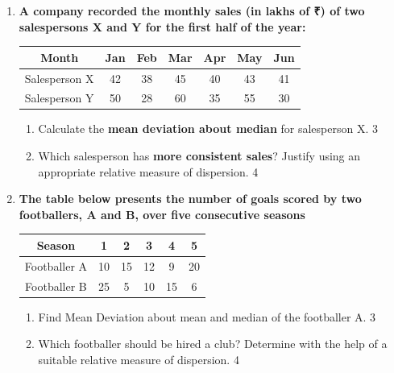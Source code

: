 \documentclass[a4paper,oneside]{book}
\begin{document}
\begin{enumerate}
  
  \begin{enumerate}
    \item
	How is the Range defined? \hfill 1
    \item
	Can the standard deviation exceed the variance? Prove. \hfill 2
    \item  
	Find the standard deviation of the above data and compare the cities. \hfill 3
    \item
	Examine the efficacy the standard deviation in light of the given context. \\ Is a better measure availabe? Analyze. \hfill 4
  \end{enumerate}

        \item
  \textbf{  A company recorded the monthly sales (in lakhs of ₹) of two salespersons X and Y for the first half of the year:}


\begin{table}[h]
\centering
\begin{tabular}{c|cccccc}
Month & Jan & Feb & Mar & Apr & May & Jun \\ \hline
Salesperson X & 42 & 38 & 45 & 40 & 43 & 41 \\
Salesperson Y & 50 & 28 & 60 & 35 & 55 & 30
\end{tabular}
\end{table}

\begin{enumerate}
    \item Calculate the \textbf{mean deviation about median} for salesperson X. \hfill 3
    
    \item Which salesperson has \textbf{more consistent sales}? Justify using an appropriate relative measure of dispersion. \hfill 4
\end{enumerate}


      \item
  \textbf{The table below presents the number of goals scored by two footballers, A and B, over five consecutive seasons}

 \begin{table}[h]
\centering
\begin{tabular}{c|c|c|c|c|c}
Season      & 1  & 2  & 3  & 4  & 5  \\ \hline
Footballer A & 10 & 15 & 12 & 9  & 20 \\ \hline
Footballer B & 25 & 5  & 10 & 15 & 6  
\end{tabular}
\end{table}

  \begin{enumerate}
    \item  
	Find Mean Deviation about mean and median of the footballer A.  \hfill 3
    \item
	Which footballer should be hired a club? Determine with the help of a suitable relative measure of dispersion. \hfill 4
\end{enumerate}

\end{enumerate}
\end{document}
